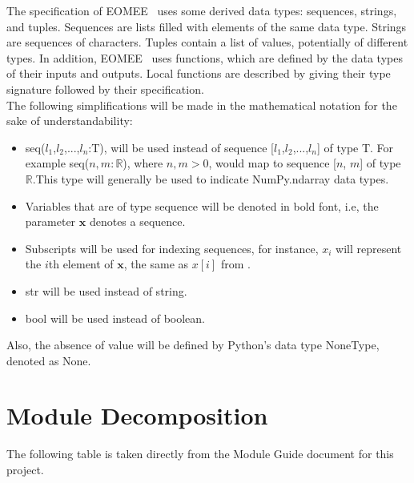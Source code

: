 \documentclass[12pt, titlepage]{article}
\begin{document}
\noindent
The specification of EOMEE \ uses some derived data types: sequences, strings, 
and tuples. Sequences are lists filled with elements of the same data type. 
Strings are sequences of characters. Tuples contain a list of values, 
potentially of different types. In addition, EOMEE \ uses functions, which
are defined by the data types of their inputs and outputs. Local functions are
described by giving their type signature followed by their specification.\\
The following simplifications will be made in the mathematical notation for the 
sake of understandability:
\begin{itemize}
	\item seq($l_1$,$l_2$,...,$l_n$:T), will be used instead of 
	sequence 
	[$l_1$,$l_2$,...,$l_n$] of type T. For example seq($n,m:\mathbb{R}$), where 
	$n,m > 0$, would map to sequence [$n$, $m$] of type $\mathbb{R}$.This 
	type will generally be used to indicate NumPy.ndarray data types.
	\item Variables that are of type sequence will be denoted in bold font, 
	i.e, the parameter $\textbf{x}$ denotes a sequence. 
	\item Subscripts will be used for indexing sequences, for instance, $x_i$ 
	will represent the $i$th element of $\textbf{x}$, the same as $x[i]$ from 
	\citet{HoffmanAndStrooper1995}.
	\item str will be used instead of string.
	\item bool will be used instead of boolean.
\end{itemize}
Also, the absence of value will be defined by Python's data type NoneType, 
denoted as None.


\section{Module Decomposition}

The following table is taken directly from the Module Guide document for this project.
\end{document}
